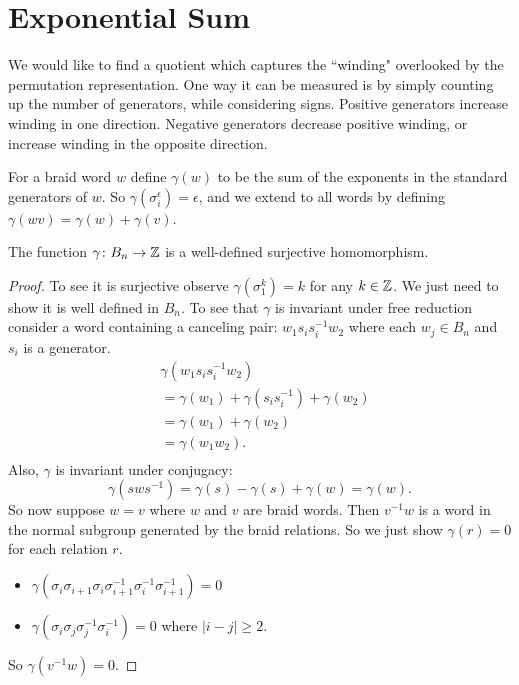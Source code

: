 \documentclass[12pt]{thesis}
\begin{document}
\section{Exponential Sum}

We would like to find a quotient which captures
the ``winding" overlooked by the permutation representation.
One way it can be measured is by simply counting up the number of generators,
while considering signs.
Positive generators increase winding in one direction.
Negative generators decrease positive winding, or increase winding in the opposite direction.

    For a braid word $w$ define $\gamma(w)$ 
    to be the sum of the exponents in the standard generators of $w$.
    So $\gamma(\sigma_{i}^{\epsilon}) = \epsilon$,
    and we extend to all words by defining $\gamma(wv) = \gamma(w) + \gamma(v)$.

\begin{proposition}
    The function $\gamma \colon B_{n} \rightarrow \mathbb{Z}$ is a well-defined surjective homomorphism.
\end{proposition}

\begin{proof}
    To see it is surjective observe $\gamma(\sigma_{1}^{k}) = k$ for any $k \in \mathbb{Z}$.
    We just need to show it is well defined in $B_{n}$.
    To see that $\gamma$ is invariant under free reduction
    consider a word containing a canceling pair: $w_{1}s_{i}s_{i}^{-1}w_{2}$
    where each $w_{j} \in B_{n}$ and $s_{i}$ is a generator.
    \[
    \begin{split}
        &\gamma(w_{1}s_{i}s_{i}^{-1}w_{2}) \\
        &= \gamma(w_{1}) + \gamma(s_{i}s_{i}^{-1}) + \gamma(w_{2}) \\
        &= \gamma(w_{1}) + \gamma(w_{2}) \\
        &= \gamma(w_{1}w_{2}). \\
    \end{split}
    \]
    Also, $\gamma$ is invariant under conjugacy:
    \[
        \gamma(sws^{-1}) = \gamma(s) - \gamma(s) + \gamma(w) = \gamma(w).
    \]
    So now suppose $w = v$ where $w$ and $v$ are braid words. 
    Then $v^{-1}w$ is a word in the normal subgroup generated by the braid relations.
    So we just show $\gamma(r) = 0$ for each relation $r$.
    \begin{itemize}
        \item $\gamma(\sigma_{i}\sigma_{i+1}\sigma_{i}\sigma_{i+1}^{-1}\sigma_{i}^{-1}\sigma_{i+1}^{-1}) = 0$
        \item $\gamma(\sigma_{i}\sigma_{j}\sigma_{j}^{-1}\sigma_{i}^{-1}) = 0$ where $|i - j| \geq 2$.
    \end{itemize}
    So $\gamma(v^{-1}w) = 0$.
\end{proof}
\end{document}
